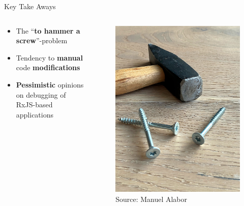 \documentclass[aspectratio=169]{beamer}
\begin{document}
\begin{frame}[fragile]{Key Take Aways}
    \begin{columns}[T]
        \begin{column}{.6\linewidth}
            \vspace{3em}
            \begin{itemize}
                \item The ``\textbf{to hammer a screw}''-problem\bigskip
                \item Tendency to \textbf{manual} code \textbf{modifications}\bigskip
                \item \textbf{Pessimistic} opinions on debugging of RxJS-based applications
	        \end{itemize}
        \end{column}
        \begin{column}{.4\linewidth}
            \begin{figure}
                \centering
                \includegraphics[width=.7\linewidth]{figures/hammer-screw.jpeg}
                \caption{\tiny{Source: Manuel Alabor}}
            \end{figure}
        \end{column}
    \end{columns}
\end{frame}

\end{document}
